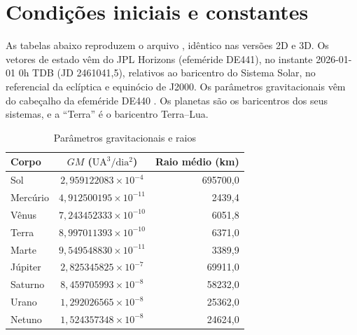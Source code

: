 \chapter{Condições iniciais e constantes}\label{ap:dados}

As tabelas abaixo reproduzem o arquivo , idêntico nas versões 2D e 3D. Os vetores de estado vêm do JPL Horizons (efeméride DE441), no instante 2026-01-01 0h TDB (JD 2461041,5), relativos ao baricentro do Sistema Solar, no referencial da eclíptica e equinócio de J2000. Os parâmetros gravitacionais vêm do cabeçalho da efeméride DE440 \cite{park2021}. Os planetas são os baricentros dos seus sistemas, e a ``Terra'' é o baricentro Terra--Lua.

\begin{table}[htb]
  \centering
  \caption{Parâmetros gravitacionais e raios}
  \label{tab:gm}
  \small
  \begin{tabular}{lcr}
    \toprule
    Corpo & $GM$ ($\mathrm{UA^3/dia^2}$) & Raio médio (km) \\
    \midrule
    Sol & $2{,}959122083\times10^{-4}$ & 695700,0 \\
Mercúrio & $4{,}912500195\times10^{-11}$ & 2439,4 \\
Vênus & $7{,}243452333\times10^{-10}$ & 6051,8 \\
Terra & $8{,}997011393\times10^{-10}$ & 6371,0 \\
Marte & $9{,}549548830\times10^{-11}$ & 3389,9 \\
Júpiter & $2{,}825345825\times10^{-7}$ & 69911,0 \\
Saturno & $8{,}459705993\times10^{-8}$ & 58232,0 \\
Urano & $1{,}292026565\times10^{-8}$ & 25362,0 \\
Netuno & $1{,}524357348\times10^{-8}$ & 24624,0 \\
    \bottomrule
  \end{tabular}
\end{table}

